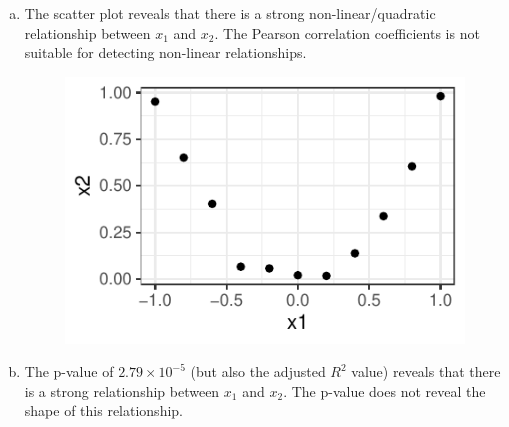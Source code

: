 {\begin{enumerate}[a)]
  The Pearson correlation coefficient is close to 0 - reflecting that there is no \textbf{linear} relationship between $x_1$ and $x_2$.
  
  \item  The scatter plot reveals that there is a strong non-linear/quadratic relationship between $x_1$ and $x_2$. The Pearson correlation coefficients is not suitable
  for detecting non-linear relationships.
  
 \begin{figure}[!ht]
  \centering
  \includegraphics[width=\maxwidth]{figure/add_Points_x1_x2_sol.pdf}
  \label{fig:pdp}
\end{figure}
 
  \item The p-value of $2.79 \times 10^{-5}$ (but also the adjusted $R^2$ value) reveals that there is a strong relationship between $x_1$ and $x_2$.
  The p-value does not reveal the shape of this relationship.
  

\end{enumerate}}
